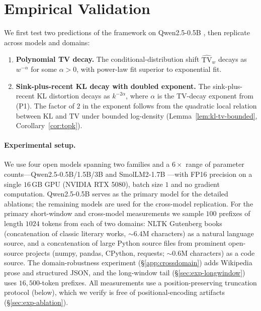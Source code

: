 \documentclass[11pt]{article}
\newcommand{\KLs}{\mathrm{KL}}
\newcommand{\TV}{\mathrm{TV}}
\theoremstyle{plain}
\theoremstyle{definition}
\theoremstyle{remark}
\begin{document}
\section{Empirical Validation}
\label{sec:experiments}

We first test two predictions of the framework on Qwen2.5-0.5B
\citep{qwen2024}, then replicate across models and domains:

\begin{enumerate}[label=\textbf{(P\arabic*)},leftmargin=*,itemsep=2pt,topsep=2pt]
\item \textbf{Polynomial TV decay.} The
conditional-distribution shift $\widehat{\TV}_w$ decays as
$w^{-\alpha}$ for some $\alpha > 0$, with power-law fit superior to
exponential fit.

\item \textbf{Sink-plus-recent KL decay with doubled exponent.} The
sink-plus-recent KL distortion decays as $k^{-2\alpha}$, where
$\alpha$ is the TV-decay exponent from (P1). The factor of $2$ in
the exponent follows from the quadratic local relation between
$\KLs$ and $\TV$ under bounded log-density
(Lemma~\ref{lem:kl-tv-bounded}, Corollary~\ref{cor:topk}).
\end{enumerate}

\paragraph{Experimental setup.}
We use four open models spanning two families and a $6\times$ range
of parameter counts---Qwen2.5-0.5B/1.5B/3B \citep{qwen2024} and
SmolLM2-1.7B \citep{allal2025smollm2}---with FP16 precision on a
single $16$\,GB GPU (NVIDIA RTX 5080), batch size $1$ and no
gradient computation. Qwen2.5-0.5B serves as the primary model for
the detailed ablations; the remaining models are used for the
cross-model replication. For the primary short-window and cross-model
measurements we sample $100$ prefixes of length $1024$
tokens from each of two domains: NLTK Gutenberg books (concatenation
of classic literary works, $\sim 6.4$M characters) as a natural
language source, and a concatenation of large Python source files
from prominent open-source projects (numpy, pandas, CPython,
requests; $\sim 0.6$M characters) as a code source. The
domain-robustness experiment (\S\ref{app:crossdomain}) adds Wikipedia
prose and structured JSON, and the long-window tail
(\S\ref{sec:exp-longwindow}) uses $16{,}500$-token prefixes. All
measurements use a position-preserving truncation protocol (below),
which we verify is free of positional-encoding artifacts
(\S\ref{sec:exp-ablation}).
\end{document}
